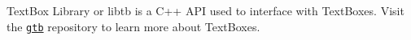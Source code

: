 Text\+Box Library or \textquotesingle{}libtb\textquotesingle{} is a C++ A\+PI used to interface with Text\+Boxes. Visit the \href{https://codrod.github.io/gtb/index.html}{\tt gtb} repository to learn more about Text\+Boxes. 